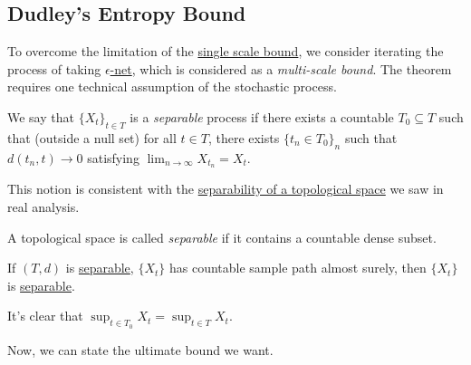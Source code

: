 \subsection{Dudley's Entropy Bound}
To overcome the limitation of the \hyperref[lma:single-scale-bound]{single scale bound}, we consider iterating the process of taking \hyperref[def:eps-net]{\(\epsilon\)-net}, which is considered as a \emph{multi-scale bound}. The theorem requires one technical assumption of the stochastic process.

\begin{definition}[Separable]\label{def:separable}
	We say that \(\{X_t\}_{t\in T}\) is a \emph{separable} process if there exists a countable \(T_0 \subseteq T\) such that (outside a null set) for all \(t\in T\), there exists \(\{t_n \in T_0\}_{n}\) such that \(d(t_n, t) \to 0\) satisfying \(\lim_{n \to \infty} X_{t_n} = X_t\).
\end{definition}

This notion is consistent with the \hyperref[prev:separable]{separability of a topological space} we saw in real analysis.

\begin{prev}[Separable]\label{prev:separable}
	A topological space is called \emph{separable} if it contains a countable dense subset.
\end{prev}

\begin{eg}
	If \((T, d)\) is \hyperref[prev:separable]{separable}, \(\{ X_t \} \) has countable sample path almost surely, then \(\{ X_t \} \) is \hyperref[def:separable]{separable}.
\end{eg}

\begin{remark}
	It's clear that \(\sup _{t\in T_0} X_t = \sup _{t\in T} X_t\).
\end{remark}

Now, we can state the ultimate bound we want.

